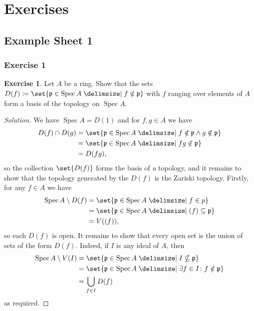 \documentclass[a4paper]{amsbook}
\theoremstyle{definition}
\newtheorem*{exercise*}{Exercise}
\DeclareMathOperator\Spec{Spec}
\begin{document}
\chapter*{Exercises}
\label{Exercises}
\section*{Example Sheet 1}
\label{Sheet1}
\subsection*{Exercise 1}
\label{Ex1}
\begin{exercise*}
\label{FirstPart}
Let $A$ be a ring. Show that the sets
$D(f)\coloneqq \set{\mathfrak{p} \in \Spec A\given f\notin \mathfrak{p}}$
with $f$ ranging over elements of $A$ form a basis of the topology on $\Spec A$.
\end{exercise*}
\begin{proof}[Solution]
We have $\Spec A = D(1)$ and for  $f, g \in A$ we have
\begin{align*}
	D(f)\cap D(g) &= \set{\mathfrak{p} \in \Spec A\given f\notin \mathfrak{p} \wedge g\notin \mathfrak{p}}\\
	&= \set{\mathfrak{p} \in \Spec A\given fg\notin \mathfrak{p}}\\
	&= D(fg),
\end{align*}
so the collection $\set{D(f)}$ forms the basis of \emph{a} topology, and it remains
to show that the topology generated by the $D(f)$ is the Zariski topology. Firstly,
for any $f \in A$ we have
\begin{align*}
	\Spec A\setminus D(f) &= \set{\mathfrak{p} \in \Spec A\given f \in p}\\
	&= \set{\mathfrak{p} \in \Spec A\given (f) \subseteq \mathfrak{p}}\\
	&= V((f)),
\end{align*}
so each $D(f)$ is open. It remains to show that every open set is the union
of sets of the form $D(f)$. Indeed, if $I$ is any ideal of $A$, then
\begin{align*}
	\Spec A\setminus V(I) &= \set{\mathfrak{p} \in \Spec A\given I\nsubseteq \mathfrak{p}}\\
	&= \set{\mathfrak{p} \in \Spec A\given \exists f\in I\colon f\notin \mathfrak{p}}\\
	&=\bigcup_{f \in I}D(f)
\end{align*}
as required.
\end{proof}
\end{document}
